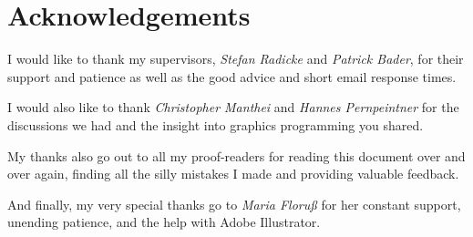 
\chapter*{Acknowledgements}
\label{cha:Acknowledgements}


I would like to thank my supervisors, \emph{Stefan Radicke} and \emph{Patrick Bader}, for their support and patience as well as the good advice and short email response times.

I would also like to thank \emph{Christopher Manthei} and \emph{Hannes Pernpeintner} for the discussions we had and the insight into graphics programming you shared.

My thanks also go out to all my proof-readers for reading this document over and over again, finding all the silly mistakes I made and providing valuable feedback.

And finally, my very special thanks go to \emph{Maria Floruß} for her constant support, unending patience, and the help with Adobe Illustrator.

